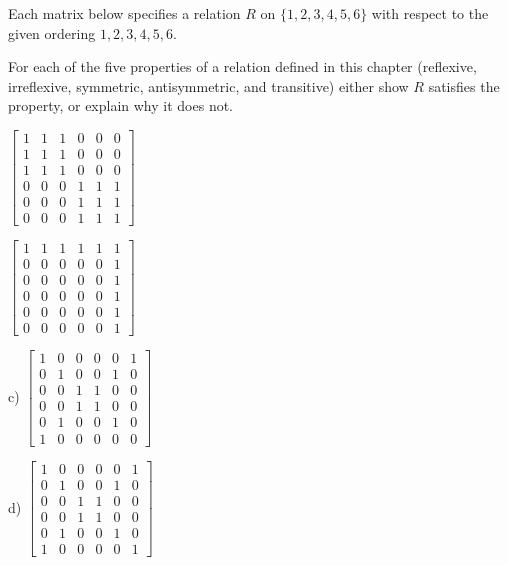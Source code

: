 \begin{exer}
Each matrix below specifies a relation $R$ on $\{1,2,3,4,5,6\}$ with respect to the
 given ordering  $1,2,3,4,5,6$. 
 
 For each of the five properties of a relation defined in this chapter (reflexive, irreflexive, symmetric, antisymmetric, and transitive) 
either show $R$ satisfies the property, or explain why it does not.

\vspace*{0.25cm}
\begin{enumerate*}[label=\alph*), itemjoin=\qquad]
\item 
 $\left[
\begin{matrix}
 1&1&1&0&0&0\\ 
 1&1&1&0&0&0\\ 
 1&1&1&0&0&0\\
 0&0&0&1&1&1\\ 
 0&0&0&1&1&1\\ 
 0&0&0&1&1&1
\end{matrix}
\right]$ 

\item 
$\left[
\begin{matrix}
 1&1&1&1&1&1\\
 0&0&0&0&0&1\\ 
 0&0&0&0&0&1\\ 
 0&0&0&0&0&1\\ 
 0&0&0&0&0&1\\ 
 0&0&0&0&0&1
\end{matrix}
\right]$
\end{enumerate*}

\vspace*{0.25cm}
\begin{enumerate*}[label=\alph*), itemjoin=\qquad]
\item[c)] 
$\left[
\begin{matrix}
 1&0&0&0&0&1\\ 
 0&1&0&0&1&0\\ 
 0&0&1&1&0&0\\ 
 0&0&1&1&0&0\\ 
 0&1&0&0&1&0\\ 
 1&0&0&0&0&0
\end{matrix}
\right]$

\item[d)]
$\left[
\begin{matrix}
 1&0&0&0&0&1\\ 
  0&1&0&0&1&0\\ 
  0&0&1&1&0&0\\ 
  0&0&1&1&0&0\\ 
  0&1&0&0&1&0\\ 
  1&0&0&0&0&1
\end{matrix}
\right]$
\end{enumerate*}
\end{exer}

